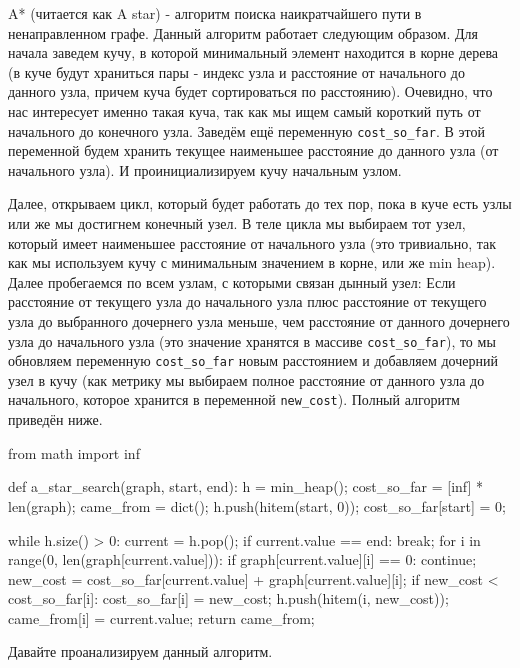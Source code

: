 A* (читается как A star) - алгоритм поиска наикратчайшего 
пути в ненаправленном графе. Данный алгоритм работает 
следующим образом. Для начала заведем кучу, в которой минимальный элемент находится в 
корне дерева (в куче будут храниться пары - индекс узла и 
расстояние от начального до данного узла, причем куча будет 
сортироваться по расстоянию). Очевидно, что нас интересует 
именно такая куча, так как мы ищем самый короткий 
путь от начального до конечного узла. Заведём ещё 
переменную \texttt{cost\_so\_far}. В этой переменной будем 
хранить текущее наименьшее расстояние до данного узла 
(от начального узла). И проинициализируем кучу 
начальным узлом.

Далее, открываем цикл, который будет работать до тех пор, пока в куче 
есть узлы или же мы достигнем конечный узел. В теле цикла мы выбираем 
тот узел, который имеет наименьшее расстояние от начального узла (это тривиально, 
так как мы используем кучу с минимальным значением в корне, или же min heap). 
Далее пробегаемся по всем узлам, с которыми связан дынный узел: Если 
расстояние от текущего узла до начального узла плюс расстояние от текущего узла 
до выбранного дочернего узла меньше, чем расстояние от данного дочернего узла до 
начального узла (это значение хранятся в массиве \texttt{cost\_so\_far}), то мы обновляем переменную 
\texttt{cost\_so\_far} новым расстоянием и добавляем дочерний узел в кучу 
(как метрику мы выбираем полное расстояние от данного узла до начального,
которое хранится в переменной \texttt{new\_cost}). Полный алгоритм приведён ниже.

\begin{python}
from math import inf

def a_star_search(graph, start, end):
	h = min_heap();
	cost_so_far = [inf] * len(graph);
	came_from = dict();
	h.push(hitem(start, 0));
	cost_so_far[start] = 0;

	while h.size() > 0:
		current = h.pop();
		if current.value == end:
			break;
		for i in range(0, len(graph[current.value])):
			if graph[current.value][i] == 0:
				continue;
			new_cost = cost_so_far[current.value] + graph[current.value][i];
			if new_cost < cost_so_far[i]: 
				cost_so_far[i] = new_cost;
				h.push(hitem(i, new_cost));
				came_from[i] = current.value;
	return came_from;
\end{python}

Давайте проанализируем данный алгоритм. 

